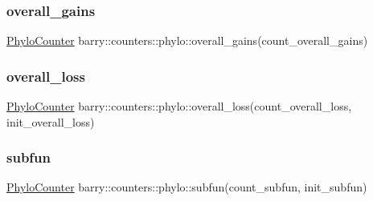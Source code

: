 \mbox{\label{namespacebarry_1_1counters_1_1phylo_afb7d5e1d4a7457c6d2c794239407dcdb}} 
\subsubsection{\texorpdfstring{overall\+\_\+gains}{overall\_gains}}
{\footnotesize\ttfamily \hyperlink{namespacebarry_1_1counters_1_1phylo_aa4a36956c99f63ed02b7068a495bb56a}{Phylo\+Counter} barry\+::counters\+::phylo\+::overall\+\_\+gains(count\+\_\+overall\+\_\+gains)}

\mbox{\label{namespacebarry_1_1counters_1_1phylo_ac9c47e5228507fb455f894f2a0978314}} 
\subsubsection{\texorpdfstring{overall\+\_\+loss}{overall\_loss}}
{\footnotesize\ttfamily \hyperlink{namespacebarry_1_1counters_1_1phylo_aa4a36956c99f63ed02b7068a495bb56a}{Phylo\+Counter} barry\+::counters\+::phylo\+::overall\+\_\+loss(count\+\_\+overall\+\_\+loss, init\+\_\+overall\+\_\+loss)}

\mbox{\label{namespacebarry_1_1counters_1_1phylo_aee78851723795b1d8ba773b3c3c58afc}} 
\subsubsection{\texorpdfstring{subfun}{subfun}}
{\footnotesize\ttfamily \hyperlink{namespacebarry_1_1counters_1_1phylo_aa4a36956c99f63ed02b7068a495bb56a}{Phylo\+Counter} barry\+::counters\+::phylo\+::subfun(count\+\_\+subfun, init\+\_\+subfun)}

